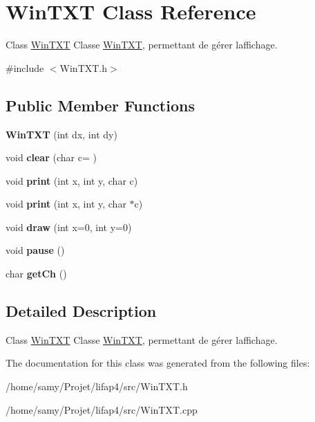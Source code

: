 \hypertarget{classWinTXT}{}\section{Win\+T\+XT Class Reference}
\label{classWinTXT}


Class \hyperlink{classWinTXT}{Win\+T\+XT} Classe \hyperlink{classWinTXT}{Win\+T\+XT}, permettant de gérer l\textquotesingle{}affichage.  




{\ttfamily \#include $<$Win\+T\+X\+T.\+h$>$}

\subsection*{Public Member Functions}
\begin{DoxyCompactItemize}
\item 
\mbox{\label{classWinTXT_ad471ddd48d2a7c43acccd1204e419527}} 
{\bfseries Win\+T\+XT} (int dx, int dy)
\item 
\mbox{\label{classWinTXT_a1b4cb203533f78bed29498591631f436}} 
void {\bfseries clear} (char c=\textquotesingle{} \textquotesingle{})
\item 
\mbox{\label{classWinTXT_a407cce45e7f81546540f4f8a9b85ce45}} 
void {\bfseries print} (int x, int y, char c)
\item 
\mbox{\label{classWinTXT_ad021d5fb9862b9ea7985f8cef50451e2}} 
void {\bfseries print} (int x, int y, char $\ast$c)
\item 
\mbox{\label{classWinTXT_af83a18827593465fc397983c97b4e886}} 
void {\bfseries draw} (int x=0, int y=0)
\item 
\mbox{\label{classWinTXT_a3e8793fd263bb51a62ec8a5e89904c49}} 
void {\bfseries pause} ()
\item 
\mbox{\label{classWinTXT_a418c66475403586ac57a80eceb409166}} 
char {\bfseries get\+Ch} ()
\end{DoxyCompactItemize}


\subsection{Detailed Description}
Class \hyperlink{classWinTXT}{Win\+T\+XT} Classe \hyperlink{classWinTXT}{Win\+T\+XT}, permettant de gérer l\textquotesingle{}affichage. 

The documentation for this class was generated from the following files\+:\begin{DoxyCompactItemize}
\item 
/home/samy/\+Projet/lifap4/src/Win\+T\+X\+T.\+h\item 
/home/samy/\+Projet/lifap4/src/Win\+T\+X\+T.\+cpp\end{DoxyCompactItemize}
